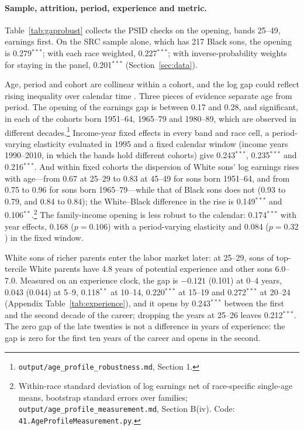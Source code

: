 

\paragraph{Sample, attrition, period, experience and metric.} Table~\ref{tab:gaprobust} collects the PSID checks on the
opening, bands 25--49, earnings first. On the SRC sample alone, which has 217 Black sons, the opening is 0.279$^{***}$;
with each race weighted, 0.227$^{***}$; with inverse-probability weights for staying in the panel, 0.201$^{***}$
(Section~\ref{sec:data}).

Age, period and cohort are collinear within a cohort, and the log gap could reflect rising inequality over calendar
time \citep{bayer2018divergent}. Three pieces of evidence separate age from period. The opening of the earnings gap is
between 0.17 and 0.28, and significant, in each of the cohorts born 1951--64, 1965--79 and 1980--89, which are observed
in different decades.\footnote{\texttt{output/age\_profile\_robustness.md}, Section 1.} Income-year fixed effects in every
band and race cell, a period-varying elasticity evaluated in 1995 and a fixed calendar window (income years 1990--2010,
in which the bands hold different cohorts) give 0.243$^{***}$, 0.235$^{***}$ and 0.216$^{***}$. And within fixed cohorts
the dispersion of White sons' log earnings rises with age---from 0.67 at 25--29 to 0.83 at 45--49 for sons born 1951--64,
and from 0.75 to 0.96 for sons born 1965--79---while that of Black sons does not (0.93 to 0.79, and 0.84 to 0.84); the
White--Black difference in the rise is 0.149$^{***}$ and 0.106$^{**}$.\footnote{Within-race standard deviation of log
earnings net of race-specific single-age means, bootstrap standard errors over families;
\texttt{output/age\_profile\_measurement.md}, Section B(iv). Code: \texttt{41.AgeProfileMeasurement.py}.} The
family-income opening is less robust to the calendar: 0.174$^{***}$ with year effects, 0.168 ($p=0.106$) with a
period-varying elasticity and 0.084 ($p=0.32$) in the fixed window.

White sons of richer parents enter the labor market later: at 25--29, sons of top-tercile White parents have 4.8 years
of potential experience and other sons 6.0--7.0. Measured on an experience clock, the gap is $-0.121$ (0.101) at 0--4
years, 0.043 (0.044) at 5--9, 0.118$^{**}$ at 10--14, 0.220$^{***}$ at 15--19 and 0.272$^{***}$ at 20--24 (Appendix
Table~\ref{tab:experience}), and it opens by 0.243$^{***}$ between the first and the second decade of the career; dropping
the years at 25--26 leaves 0.212$^{***}$. The zero gap of the late twenties is not a difference in years of experience:
the gap is zero for the first ten years of the career and opens in the second.

